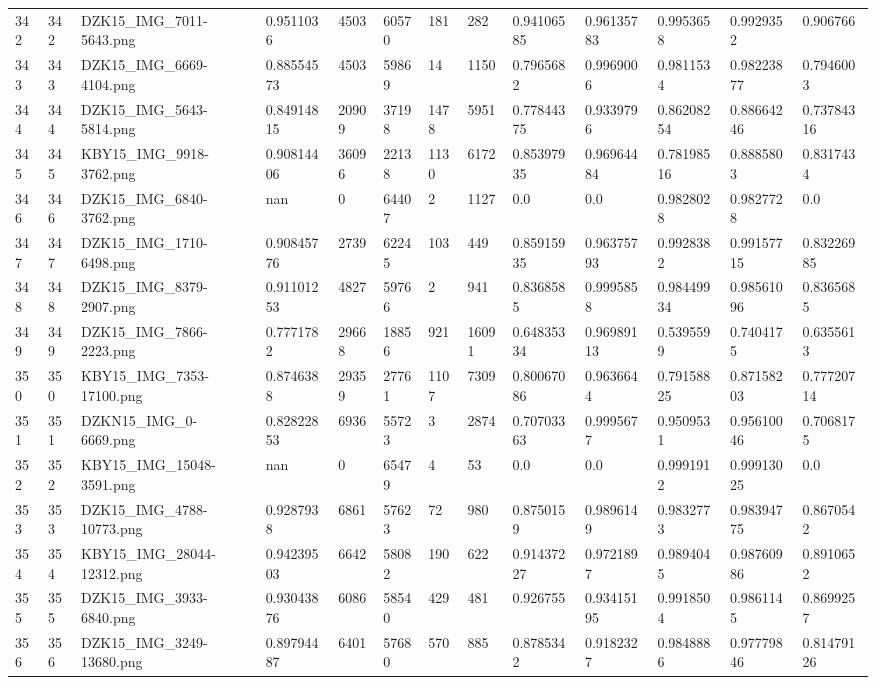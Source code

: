 \documentclass[11pt, a4paper, twoside]{report}
\begin{document}
\begin{longtable}[c]{@{}lllllllllllll@{}}
342 & 342 & DZK15\_IMG\_7011-5643.png & 0.9511036 & 4503 & 60570 & 181 & 282 & 0.94106585 & 0.96135783 & 0.9953658 & 0.9929352 & 0.906766 \\
343 & 343 & DZK15\_IMG\_6669-4104.png & 0.88554573 & 4503 & 59869 & 14 & 1150 & 0.7965682 & 0.9969006 & 0.9811534 & 0.98223877 & 0.7946003 \\
344 & 344 & DZK15\_IMG\_5643-5814.png & 0.84914815 & 20909 & 37198 & 1478 & 5951 & 0.77844375 & 0.9339796 & 0.86208254 & 0.88664246 & 0.73784316 \\
345 & 345 & KBY15\_IMG\_9918-3762.png & 0.90814406 & 36096 & 22138 & 1130 & 6172 & 0.85397935 & 0.96964484 & 0.78198516 & 0.8885803 & 0.8317434 \\
346 & 346 & DZK15\_IMG\_6840-3762.png & nan & 0 & 64407 & 2 & 1127 & 0.0 & 0.0 & 0.9828028 & 0.9827728 & 0.0 \\
347 & 347 & DZK15\_IMG\_1710-6498.png & 0.90845776 & 2739 & 62245 & 103 & 449 & 0.85915935 & 0.96375793 & 0.9928382 & 0.99157715 & 0.83226985 \\
348 & 348 & DZK15\_IMG\_8379-2907.png & 0.91101253 & 4827 & 59766 & 2 & 941 & 0.8368585 & 0.9995858 & 0.98449934 & 0.98561096 & 0.8365685 \\
349 & 349 & DZK15\_IMG\_7866-2223.png & 0.7771782 & 29668 & 18856 & 921 & 16091 & 0.64835334 & 0.96989113 & 0.5395599 & 0.7404175 & 0.6355613 \\
350 & 350 & KBY15\_IMG\_7353-17100.png & 0.8746388 & 29359 & 27761 & 1107 & 7309 & 0.80067086 & 0.9636644 & 0.79158825 & 0.87158203 & 0.77720714 \\
351 & 351 & DZKN15\_IMG\_0-6669.png & 0.82822853 & 6936 & 55723 & 3 & 2874 & 0.70703363 & 0.9995677 & 0.9509531 & 0.95610046 & 0.7068175 \\
352 & 352 & KBY15\_IMG\_15048-3591.png & nan & 0 & 65479 & 4 & 53 & 0.0 & 0.0 & 0.9991912 & 0.99913025 & 0.0 \\
353 & 353 & DZK15\_IMG\_4788-10773.png & 0.9287938 & 6861 & 57623 & 72 & 980 & 0.8750159 & 0.9896149 & 0.9832773 & 0.98394775 & 0.8670542 \\
354 & 354 & KBY15\_IMG\_28044-12312.png & 0.94239503 & 6642 & 58082 & 190 & 622 & 0.91437227 & 0.9721897 & 0.9894045 & 0.98760986 & 0.8910652 \\
355 & 355 & DZK15\_IMG\_3933-6840.png & 0.93043876 & 6086 & 58540 & 429 & 481 & 0.926755 & 0.93415195 & 0.9918504 & 0.9861145 & 0.8699257 \\
356 & 356 & DZK15\_IMG\_3249-13680.png & 0.89794487 & 6401 & 57680 & 570 & 885 & 0.8785342 & 0.9182327 & 0.9848886 & 0.97779846 & 0.81479126 \\

\end{longtable}
\end{document}
